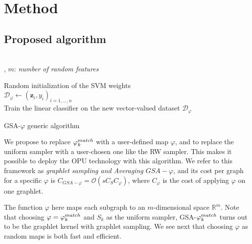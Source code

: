 \documentclass{article}
\begin{document}
\section{Method} \label{ssed to get a lowerec:pagestyle}
\subsection{Proposed algorithm}
\label{sec:algo}
\begin{algorithm}[h]
\DontPrintSemicolon
  \\
  , $m$: \emph{number of random features}\\
  
  \Algo{\\}
  Random initialization of the SVM weights\\
  $\mathcal{D}_{\varphi}\gets (\mathbf{z}_i,y_i)_{i=1,\ldots, n}$\\
  Train the linear classifier on the new vector-valued dataset $\mathcal{D}_{\varphi}$
\caption{GSA-$\varphi$ generic algorithm}
\end{algorithm}

 We propose to replace $\varphi^{match}_k$ with a user-defined map $\varphi$, and to replace the uniform sampler with a user-chosen one like the RW sampler.  This makes it possible to deploy the OPU technology with this algorithm. We refer to this framework as \emph{graphlet sampling and Averaging $GSA-\varphi$}, and its cost per graph for a specific $\varphi$ is $C_{GSA-\varphi}= \mathcal{O}\left(s C_S C_{\varphi}\right)$, where $C_{\varphi}$ is the cost of applying $\varphi$ on one graphlet. 

The function $\varphi$ here maps each subgraph to an $m$-dimensional space $\mathbb{R}^m$. Note that choosing $\varphi = \varphi^{match}_k$ and $S_k$ as the uniform sampler, GSA-$\varphi^{match}_k$ turns out to be the  graphlet kernel with graphlet sampling.  We see next that choosing  $\varphi$ as random maps is both fast and efficient.
\end{document}
